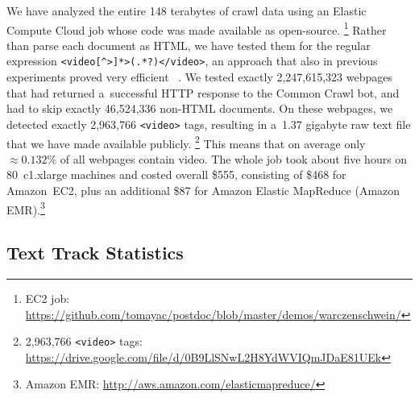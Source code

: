 \documentclass{sig-alternate}
\newcommand{\inlinelistingsize}{\fontsize{8pt}{11pt}}
\let\oldurl\url
\renewcommand{\url}[1]{\inlinelistingsize\oldurl{#1}}
\begin{document}
We have analyzed the entire 148 terabytes of crawl data
using an Elastic Compute Cloud job
whose code was made available as open-source.%
\footnote{EC2 job:
\url{https://github.com/tomayac/postdoc/blob/master/demos/warczenschwein/}}
Rather than parse each document as HTML,
we have tested them for the regular expression
\texttt{<video[\^{}>]*>(.*?)</video>},
an approach that also in previous experiments
proved very efficient%
~\cite{bizer2013deployment,muhleisen2012web}.
We tested exactly 2,247,615,323 webpages
that had returned a~successful HTTP response to the Common Crawl bot,
and had to skip exactly 46,524,336  non-HTML documents.
On these webpages, we detected exactly
2,963,766 \texttt{<video>} tags,
resulting in a~1.37 gigabyte raw text file
that we have made available publicly.%
\footnote{2,963,766 \texttt{<video>} tags: \url{https://drive.google.com/file/d/0B9LlSNwL2H8YdWVIQmJDaE81UEk}}
This means that on average only ${\approx}0.132\%$ of all webpages contain video.
The whole job took about five hours on
80~c1.xlarge machines and costed overall \$555,
consisting of \$468 for Amazon~EC2,
plus an additional \$87 for Amazon Elastic MapReduce
 (Amazon EMR).\footnote{Amazon EMR:
\url{http://aws.amazon.com/elasticmapreduce/}}

\subsection{Text Track Statistics}
\label{sec:text-track-statistics}
\end{document}
